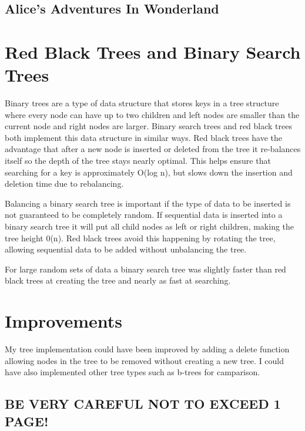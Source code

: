 \documentclass[12pt]{article} %
\begin{document}
\pagestyle{empty} %

\begin{center}
\section*{Alice's Adventures In Wonderland}
\end{center}

\section{Red Black Trees and Binary Search Trees}

Binary trees are a type of data structure that stores keys in a
tree structure where every node can have up to two children and
left nodes are smaller than the current node and right nodes are larger.
Binary search trees and red black trees both implement this data
structure in similar ways. Red black trees have the advantage that
after a new node is inserted or deleted from the tree it re-balances
itself so the depth of the tree stays nearly optimal. This helps
ensure that searching for a key is approximately O(log n), but
slows down the insertion and deletion time due to rebalancing.

Balancing a binary search tree is important if the type of data
to be inserted is not guaranteed to be completely random. If 
sequential data is inserted into a binary search tree it will
put all child nodes as left or right children, making the tree
height 0(n). Red black trees avoid this happening by rotating the
tree, allowing sequential data to be added without unbalancing the
tree.

For large random sets of data a binary search tree was slightly
faster than red black trees at creating the tree and nearly as
fast at searching.

\section{Improvements}

My tree implementation could have been improved by adding a delete
function allowing nodes in the tree to be removed without creating
a new tree. I could have also implemented other tree types such as
b-trees for camparison.

\subsection*{BE VERY CAREFUL NOT TO EXCEED 1 PAGE!}
\end{document}
